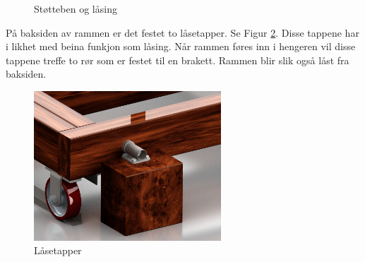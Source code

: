 \begin{figure}[H]
\centering   
{}
\qquad
{}
\caption{Støtteben og låsing}
\label{F5}
\end{figure}

På baksiden av rammen er det festet to låsetapper. Se Figur \ref{F6}. Disse tappene har i likhet med beina funkjon som låsing. Når rammen føres inn i hengeren vil disse tappene treffe to rør som er festet til en brakett. Rammen blir slik også låst fra baksiden.  

\begin{figure}[H]
\centerline{\includegraphics[width=7cm]{images/8.png}}
\caption{Låsetapper}
\label{F6}
\end{figure}
